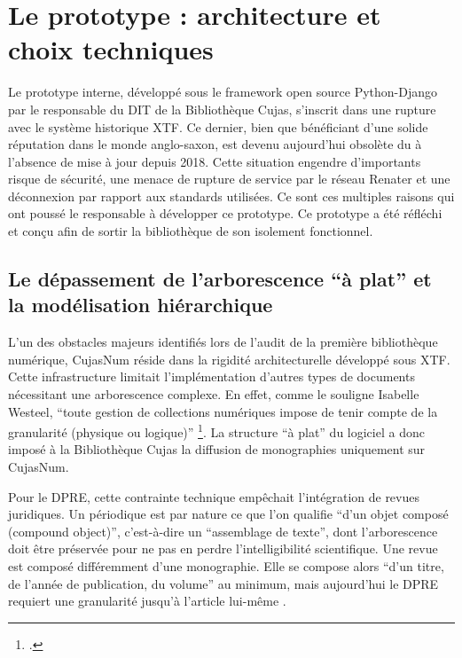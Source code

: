 \section{Le prototype : architecture et choix techniques}
Le prototype interne, développé sous le framework open source Python-Django par le responsable du \ac{DIT} de la Bibliothèque Cujas, s'inscrit dans une rupture avec le système historique \ac{XTF}. Ce dernier, bien que bénéficiant d'une solide réputation dans le monde anglo-saxon, est devenu aujourd'hui obsolète du à l'absence de mise à jour depuis 2018. Cette situation engendre d'importants risque de sécurité, une menace de rupture de service par le réseau Renater et une déconnexion par rapport aux standards utilisées. Ce sont ces multiples raisons qui ont poussé le responsable à développer ce prototype. Ce prototype a été réfléchi et conçu afin de sortir la bibliothèque de son isolement fonctionnel.

\subsection{Le dépassement de l'arborescence \enquote{à plat} et la modélisation hiérarchique}
L'un des obstacles majeurs identifiés lors de l'audit de la première bibliothèque numérique, CujasNum réside dans la rigidité architecturelle développé sous \ac{XTF}. Cette infrastructure limitait l'implémentation d'autres types de documents nécessitant une arborescence complexe. En effet, comme le souligne Isabelle Westeel, \enquote{toute gestion de collections numériques impose de tenir compte de la granularité (physique ou logique)} \footcite{westeelIndexerStructurerEchanger2010}. La structure \enquote{à plat} du logiciel a donc imposé à la Bibliothèque Cujas la diffusion de monographies uniquement sur CujasNum. 

Pour le \ac{DPRE}, cette contrainte technique empêchait l'intégration de revues juridiques. Un périodique est par nature ce que l'on qualifie \enquote{d'un objet composé (compound object)}, c'est-à-dire un \enquote{assemblage de texte}, dont l'arborescence doit être préservée pour ne pas en perdre l'intelligibilité scientifique. Une revue est composé différemment d'une monographie. Elle se compose alors \enquote{d'un titre, de l'année de publication, du volume} au minimum, mais aujourd'hui le \ac{DPRE} requiert une granularité jusqu'à l'article lui-même . 

